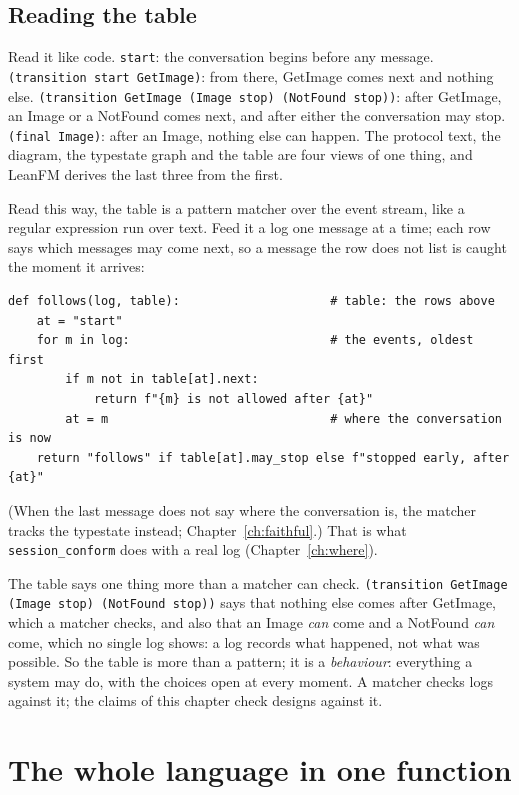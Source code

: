 
\subsection{Reading the table}

Read it like code. \texttt{start}: the conversation begins before any message.
\texttt{(transition start GetImage)}: from there, GetImage comes next and nothing else.
\texttt{(transition GetImage (Image stop) (NotFound stop))}: after GetImage, an Image or a
NotFound comes next, and after either the conversation may stop. \texttt{(final Image)}:
after an Image, nothing else can happen. The protocol text, the diagram, the typestate graph
and the table are four views of one thing, and LeanFM derives the last three from the
first.

Read this way, the table is a pattern matcher over the event stream, like a regular
expression run over text. Feed it a log one message at a time; each row says which messages
may come next, so a message the row does not list is caught the moment it arrives:
\begin{lstlisting}[language={},basicstyle=\ttfamily\footnotesize]
def follows(log, table):                     # table: the rows above
    at = "start"
    for m in log:                            # the events, oldest first
        if m not in table[at].next:
            return f"{m} is not allowed after {at}"
        at = m                               # where the conversation is now
    return "follows" if table[at].may_stop else f"stopped early, after {at}"
\end{lstlisting}
(When the last message does not say where the conversation is, the matcher tracks the
typestate instead; Chapter~\ref{ch:faithful}.) That is what \texttt{session\_conform} does
with a real log (Chapter~\ref{ch:where}).

The table says one thing more than a matcher can check. \texttt{(transition GetImage (Image
stop) (NotFound stop))} says that nothing else comes after GetImage, which a matcher
checks, and also that an Image \emph{can} come and a NotFound \emph{can} come, which no
single log shows: a log records what happened, not what was possible. So the table is more
than a pattern; it is a \emph{behaviour}: everything a system may do, with the choices open
at every moment. A matcher checks logs against it; the claims of this chapter check designs
against it.

\section{The whole language in one function}

